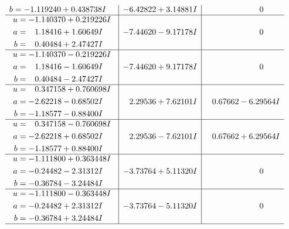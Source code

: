 \documentclass[1p]{elsarticle_modified}
\theoremstyle{definition}
\begin{document}
$$\begin{array}{c|c|c}
\begin{aligned}
b &= -1.119240 + 0.438738 I\end{aligned}
 & -6.42822 + 3.14881 I & \phantom{-0.000000 } 0 \\ \hline\begin{aligned}
u &= -1.140370 + 0.219226 I \\
a &= \phantom{-}1.18416 + 1.60649 I \\
b &= \phantom{-}0.40484 + 2.47427 I\end{aligned}
 & -7.44620 - 9.17178 I & \phantom{-0.000000 } 0 \\ \hline\begin{aligned}
u &= -1.140370 - 0.219226 I \\
a &= \phantom{-}1.18416 - 1.60649 I \\
b &= \phantom{-}0.40484 - 2.47427 I\end{aligned}
 & -7.44620 + 9.17178 I & \phantom{-0.000000 } 0 \\ \hline\begin{aligned}
u &= \phantom{-}0.347158 + 0.760698 I \\
a &= -2.62218 - 0.68502 I \\
b &= -1.18577 - 0.88400 I\end{aligned}
 & \phantom{-}2.29536 + 7.62101 I & \phantom{-}0.67662 - 6.29564 I \\ \hline\begin{aligned}
u &= \phantom{-}0.347158 - 0.760698 I \\
a &= -2.62218 + 0.68502 I \\
b &= -1.18577 + 0.88400 I\end{aligned}
 & \phantom{-}2.29536 - 7.62101 I & \phantom{-}0.67662 + 6.29564 I \\ \hline\begin{aligned}
u &= -1.111800 + 0.363448 I \\
a &= -0.24482 - 2.31312 I \\
b &= -0.36784 - 3.24484 I\end{aligned}
 & -3.73764 + 5.11320 I & \phantom{-0.000000 } 0 \\ \hline\begin{aligned}
u &= -1.111800 - 0.363448 I \\
a &= -0.24482 + 2.31312 I \\
b &= -0.36784 + 3.24484 I\end{aligned}
 & -3.73764 - 5.11320 I & \phantom{-0.000000 } 0\\
 \hline 
 \end{array}$$\newpage$$\begin{array}{c|c|c}  

\end{array}$$
\end{document}
